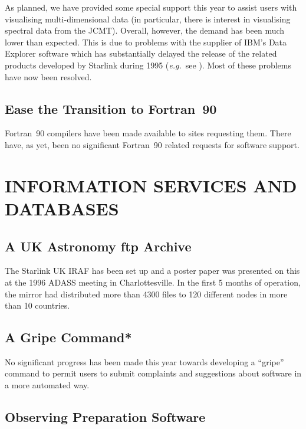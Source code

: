 As planned, we have provided some special support this year to assist
users with visualising multi-dimensional data (in particular, there is
interest in visualising spectral data from the JCMT). Overall,
however, the demand has been much lower than expected. This is due to
problems with the supplier of IBM's Data Explorer software which has
substantially delayed the release of the related products developed by
Starlink during 1995 ({\em e.g.}\ see ). Most
of these problems have now been resolved.

\subsection{Ease the Transition to Fortran~90}

Fortran~90 compilers have been made available to sites requesting
them.  There have, as yet, been no significant Fortran~90 related
requests for software support.

\section{INFORMATION SERVICES AND DATABASES}

\subsection{A UK Astronomy ftp Archive}

The Starlink UK IRAF
 has
been set up and a poster paper was presented on this at the 1996 ADASS
meeting in Charlottesville. In the first 5 months of operation, the
mirror had distributed more than 4300 files to 120 different nodes in
more than 10 countries.

\subsection{A Gripe Command*}

No significant progress has been made this year towards developing a
``gripe'' command to permit users to submit complaints and suggestions
about software in a more automated way.

\subsection{Observing Preparation Software}

